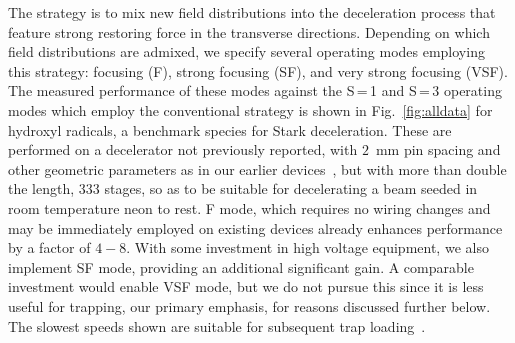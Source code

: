 \documentclass[%
 reprint,
 amsmath,amssymb,
 aps,
prl,
]{revtex4-1}
\begin{document}
The strategy is to mix new field distributions into the deceleration process that feature strong restoring force in the transverse directions.
Depending on which field distributions are admixed, we specify several operating modes employing this strategy: focusing (F), strong focusing (SF), and very strong focusing (VSF).
The measured performance of these modes against the S\,=\,1 and S\,=\,3 operating modes which employ the conventional strategy is shown in Fig.~\ref{fig:alldata} for hydroxyl radicals, a benchmark species for Stark deceleration.
These are performed on a decelerator not previously reported, with $2$~mm pin spacing and other geometric parameters as in our earlier devices~\cite{Bochinski2004,Sawyer2007}, but with more than double the length, $333$ stages, so as to be suitable for decelerating a beam seeded in room temperature neon to rest.
F mode, which requires no wiring changes and may be immediately employed on existing devices already enhances performance by a factor of $4-8$.
With some investment in high voltage equipment, we also implement SF mode, providing an additional significant gain. %
A comparable investment would enable VSF mode, but we do not pursue this since it is less useful for trapping, our primary emphasis, for reasons discussed further below.
The slowest speeds shown are suitable for subsequent trap loading~\cite{}.


\end{document}

